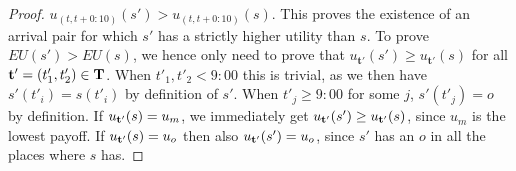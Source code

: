 \documentclass[twocolumn,a4paper,superscriptaddress,nofootinbib]{revtex4}
\begin{document}
\begin{proof}
$u_{(t,t+0{:}10)}(s') > u_{(t,t+0{:}10)}(s)$. %
This proves the existence of an arrival pair for which $s'$ has a strictly higher utility than $s$. To prove $EU(s') > EU(s)$, we hence only need to prove that $u_\mathbf{t'}(s') \geq u_\mathbf{t'}(s)$ for all $\mathbf{t'} = (t'_1,t'_2) \in \bf T$. When $t'_1,t'_2 < 9{:}00$ this is trivial, as we then have $s'(t'_i) = s(t'_i)$ by definition of $s'$. When $t'_j \geq 9{:}00$ for some $j$, $s'(t'_j) = o$ by definition.
If $u_{\bf t'}(s) = u_m$, we immediately get $u_{\bf t'}(s') \geq u_{\bf t'}(s)$, since $u_m$ is the lowest payoff. If $u_{\bf t'}(s) = u_o$ then also $u_{\bf t'}(s') = u_o$, since $s'$ has an $o$ in all the places where $s$ has. 
\end{proof}
\end{document}
